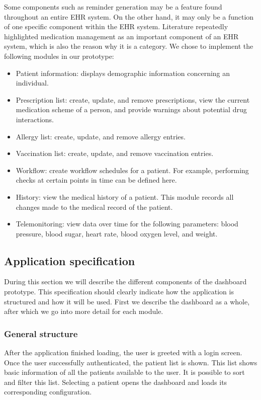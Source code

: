         \noindent Some components such as reminder generation may be a feature found throughout an entire EHR system. On the other hand, it may only be a function of one specific component within the EHR system. Literature repeatedly highlighted medication management as an important component of an EHR system, which is also the reason why it is a category. We chose to implement the following modules in our prototype:
        \begin{itemize}
            \item Patient information: displays demographic information concerning an individual.
            \item Prescription list: create, update, and remove prescriptions, view the current medication scheme of a person, and provide warnings about potential drug interactions.
            \item Allergy list: create, update, and remove allergy entries.
            \item Vaccination list: create, update, and remove vaccination entries.
            \item Workflow: create workflow schedules for a patient. For example, performing checks at certain points in time can be defined here.
            \item History: view the medical history of a patient. This module records all changes made to the medical record of the patient.
            \item Telemonitoring: view data over time for the following parameters: blood pressure, blood sugar, heart rate, blood oxygen level, and weight.
        \end{itemize}

    \subsection{Application specification}\label{app_specification}

    During this section we will describe the different components of the dashboard prototype. This specification should clearly indicate how the application is structured and how it will be used. First we describe the dashboard as a whole, after which we go into more detail for each module.

        \subsubsection{General structure}

        After the application finished loading, the user is greeted with a login screen. Once the user successfully authenticated, the patient list is shown. This list shows basic information of all the patients available to the user. It is possible to sort and filter this list. Selecting a patient opens the dashboard and loads its corresponding configuration.

